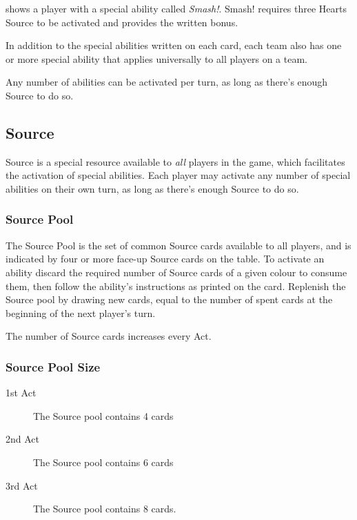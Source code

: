  shows a player with a special ability called \textit{Smash!}.
Smash! requires three Hearts Source to be activated and provides the written bonus.

In addition to the special abilities written on each card, each team also has one or more special ability that applies universally to all players on a team.

\begin{note} 
    Any number of abilities can be activated per turn, as long as there's enough Source to do so.
\end{note}
\subsection{Source}
Source is a special resource available to \textit{all} players in the game, which facilitates the activation of special abilities.
Each player may activate any number of special abilities on their own turn, as long as there's enough Source to do so.

\subsubsection{Source Pool}
The Source Pool is the set of common Source cards available to all players, and is indicated by four or more face-up Source cards on the table.
To activate an ability discard the required number of Source cards of a given colour to consume them, then follow the ability's instructions as printed on the card.
Replenish the Source pool by drawing new cards, equal to the number of spent cards at the beginning of the next player's turn.

The number of Source cards increases every Act.
\subsubsection{Source Pool Size}
\begin{description}
    \item[1st Act] The Source pool contains 4 cards
    \item[2nd Act] The Source pool contains 6 cards
    \item[3rd Act] The Source pool contains 8 cards.
\end{description}